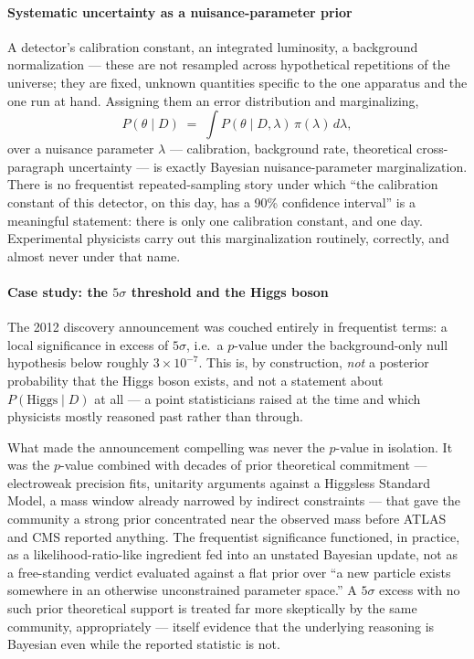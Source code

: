 \paragraph{Systematic uncertainty as a nuisance-parameter prior}

A detector's calibration constant, an integrated luminosity, a background
normalization --- these are not resampled across hypothetical repetitions of
the universe; they are fixed, unknown quantities specific to the one apparatus
and the one run at hand. Assigning them an error distribution and
marginalizing,
\begin{equation}
P(\theta \mid D) \;=\; \int P(\theta \mid D, \lambda)\,\pi(\lambda)\, d\lambda,
\end{equation}
over a nuisance parameter $\lambda$ --- calibration, background rate,
theoretical cross-paragraph uncertainty --- is exactly Bayesian
nuisance-parameter marginalization. There is no frequentist repeated-sampling
story under which ``the calibration constant of this detector, on this day, has
a 90\% confidence interval'' is a meaningful statement: there is only one
calibration constant, and one day. Experimental physicists carry out this
marginalization routinely, correctly, and almost never under that name.

\paragraph{Case study: the $5\sigma$ threshold and the Higgs boson}

The 2012 discovery announcement was couched entirely in frequentist terms: a
local significance in excess of $5\sigma$, i.e.\ a $p$-value under the
background-only null hypothesis below roughly $3\times10^{-7}$. This is, by
construction, \emph{not} a posterior probability that the Higgs boson exists,
and not a statement about $P(\text{Higgs} \mid D)$ at all --- a point
statisticians raised at the time and which physicists mostly reasoned past
rather than through.

\begin{remark}
What made the announcement compelling was never the $p$-value in isolation. It
    was the $p$-value combined with decades of prior theoretical commitment ---
    electroweak precision fits, unitarity arguments against a Higgsless
    Standard Model, a mass window already narrowed by indirect constraints ---
    that gave the community a strong prior concentrated near the observed mass
    before ATLAS and CMS reported anything. The frequentist significance
    functioned, in practice, as a likelihood-ratio-like ingredient fed into an
    unstated Bayesian update, not as a free-standing verdict evaluated against
    a flat prior over ``a new particle exists somewhere in an otherwise
    unconstrained parameter space.'' A $5\sigma$ excess with no such prior
    theoretical support is treated far more skeptically by the same community,
    appropriately --- itself evidence that the underlying reasoning is Bayesian
    even while the reported statistic is not.
\end{remark}

